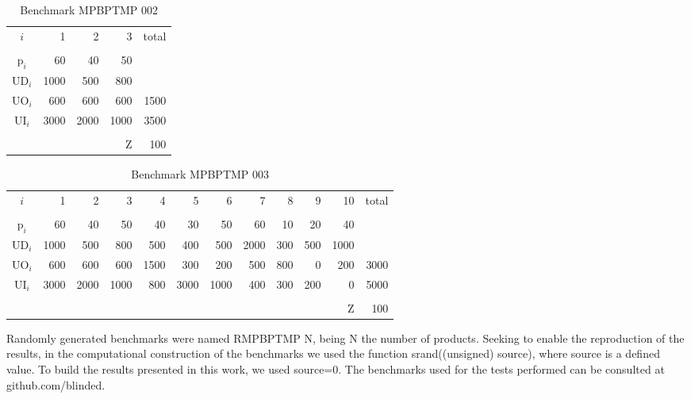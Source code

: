 \documentclass[authoryear,preprint,12pt]{elsarticle}
\begin{document}
\begin{table}[h]
\begin{center}
\begin{tabular}[c]{c r r r r}
$i$ & 1 & 2 & 3 & total \\
\cline {1-5} \\
$\textrm{p}_i$ & 60 & 40 & 50 \\
$\textrm{UD}_i$ & 1000 & 500 & 800 \\
$\textrm{UO}_i$ & 600 & 600 & 600 & 1500 \\
$\textrm{UI}_i$ & 3000 & 2000 & 1000 & 3500 \\
\cline {1-5} \\
& & & $\textrm{Z}$ & 100 \\
\end{tabular}
\caption{Benchmark MPBPTMP 002}
\label{tab:MBPTMP002}
\end{center}
\end{table}

\begin{table}[h]
\begin{center}
\begin{small}
\begin{tabular}[c]{c r r r r r r r r r r r }
$i$ & 1 & 2 & 3 & 4 & 5 & 6 & 7 & 8 & 9 & 10 & total \\
\cline {1-12} \\
$\textrm{p}_i$ & 60 & 40 & 50 & 40 & 30 & 50 & 60 & 10 & 20 & 40\\
$\textrm{UD}_i$ & 1000 & 500 & 800 & 500 & 400 & 500 & 2000 & 300 & 500 & 1000 \\
$\textrm{UO}_i$ & 600 & 600 & 600 & 1500 & 300 & 200 & 500 & 800 & 0 & 200 & 3000 \\
$\textrm{UI}_i$ & 3000 & 2000 & 1000 & 800 & 3000 & 1000 & 400 & 300 & 200 & 0 & 5000 \\
\cline {1-12} \\
& & & & & & & & & & $\textrm{Z}$ & 100 \\
\end{tabular}
\caption{Benchmark MPBPTMP 003}
\label{tab:MBPTMP003}
\end{small}
\end{center}
\end{table}

Randomly generated benchmarks were named RMPBPTMP $\textrm{N}$, being $\textrm{N}$ the number of products. Seeking to enable the reproduction of the results, in the computational construction of the benchmarks we used the function srand((unsigned) source), where source is a defined value. To build the results presented in this work, we used source=0. The benchmarks used for the tests performed can be consulted at github.com/blinded.
\end{document}
